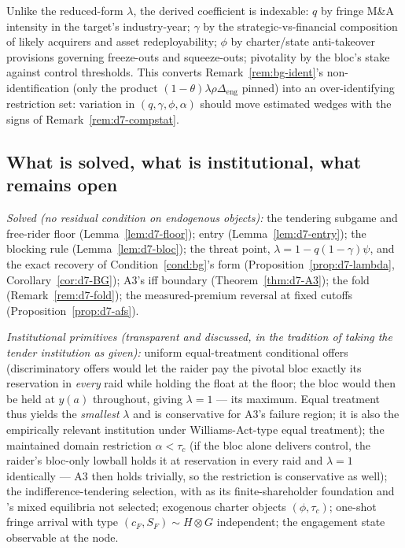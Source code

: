 \begin{remark}
\label{rem:d7-testable}
Unlike the reduced-form $\lambda$, the derived coefficient is indexable: $q$ by fringe M\&A intensity in the target's industry-year; $\gamma$ by the strategic-vs-financial composition of likely acquirers and asset redeployability; $\phi$ by charter/state anti-takeover provisions governing freeze-outs and squeeze-outs; pivotality by the bloc's stake against control thresholds. This converts Remark~\ref{rem:bg-ident}'s non-identification (only the product $(1-\theta)\lambda\rho\Delta_{\mathrm{eng}}$ pinned) into an over-identifying restriction set: variation in $(q,\gamma,\phi,\alpha)$ should move estimated wedges with the signs of Remark~\ref{rem:d7-compstat}.
\end{remark}

\subsection{What is solved, what is institutional, what remains open}
\label{app:d7-ledger}

\emph{Solved (no residual condition on endogenous objects):} the tendering subgame and free-rider floor (Lemma~\ref{lem:d7-floor}); entry (Lemma~\ref{lem:d7-entry}); the blocking rule (Lemma~\ref{lem:d7-bloc}); the threat point, $\lambda=1-q(1-\gamma)\psi$, and the exact recovery of Condition~\ref{cond:bg}'s form (Proposition~\ref{prop:d7-lambda}, Corollary~\ref{cor:d7-BG}); A3's iff boundary (Theorem~\ref{thm:d7-A3}); the fold (Remark~\ref{rem:d7-fold}); the measured-premium reversal at fixed cutoffs (Proposition~\ref{prop:d7-afs}).

\emph{Institutional primitives (transparent and discussed, in the tradition of taking the tender institution as given):} uniform equal-treatment conditional offers (discriminatory offers would let the raider pay the pivotal bloc exactly its reservation in \emph{every} raid while holding the float at the floor; the bloc would then be held at $y(a)$ throughout, giving $\lambda=1$ --- its maximum. Equal treatment thus yields the \emph{smallest} $\lambda$ and is conservative for A3's failure region; it is also the empirically relevant institution under Williams-Act-type equal treatment); the maintained domain restriction $\alpha<\tau_{c}$ (if the bloc alone delivers control, the raider's bloc-only lowball holds it at reservation in every raid and $\lambda=1$ identically --- A3 then holds trivially, so the restriction is conservative as well); the \citet{GrossmanHart1980} indifference-tendering selection, with \citet{BagnoliLipman1988} as its finite-shareholder foundation and \citet{HolmstromNalebuff1992}'s mixed equilibria not selected; exogenous charter objects $(\phi,\tau_{c})$; one-shot fringe arrival with type $(c_{F},S_{F})\sim H\otimes G$ independent; the engagement state observable at the node.

